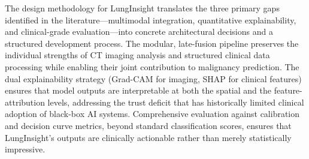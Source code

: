 {The design methodology for LungInsight translates the three primary gaps identified in the literature---multimodal integration, quantitative explainability, and clinical-grade evaluation---into concrete architectural decisions and a structured development process. The modular, late-fusion pipeline preserves the individual strengths of CT imaging analysis and structured clinical data processing while enabling their joint contribution to malignancy prediction. The dual explainability strategy (Grad-CAM for imaging, SHAP for clinical features) ensures that model outputs are interpretable at both the spatial and the feature-attribution levels, addressing the trust deficit that has historically limited clinical adoption of black-box AI systems. Comprehensive evaluation against calibration and decision curve metrics, beyond standard classification scores, ensures that LungInsight's outputs are clinically actionable rather than merely statistically impressive.

}